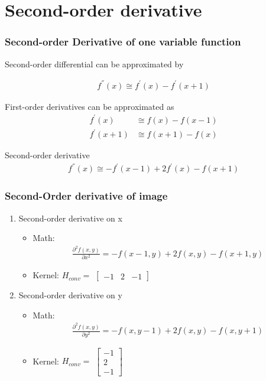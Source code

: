 \documentclass[english,11pt,table,handout]{beamer}
\begin{document}
\section{Second-order derivative}
\frame
{
	\frametitle{Second-order Derivative of one variable function}
	Second-order differential can be approximated by
	
	
	\begin{align} 
		\nonumber
		f^{''}(x) \cong f^{'}(x)  - f^{'}(x+1)
	\end{align}
	
	
	First-order derivatives can be approximated as
	\begin{align}
		\nonumber 
		f^{'}(x) &\cong f(x) - f(x-1) \\
		\nonumber 
		f^{'}(x+1) &\cong f(x+1) - f(x)
	\end{align}
	
	\begin{alertblock}{Second-order derivative}
		\begin{align} 
		\nonumber
		f^{''}(x) \cong -f^{'}(x-1)  + 2f^{'}(x) - f(x+1)
		\end{align}
	\end{alertblock}
	
}
\frame
{
	\frametitle{Second-Order derivative of image}
	
	\begin{enumerate}
		\item Second-order derivative on x
		\begin{itemize}
			\item Math: 
			\begin{align}
				\nonumber
				\frac{\partial^{2} f(x,y)}{\partial x^2} = -f(x-1, y) + 2f(x,y) - f(x+1,y)
			\end{align}
			
			
			\item Kernel:  $H_{conv} = $ $\left[ \begin{array}{rrr} -1 & 2 & -1 \end{array}\right] $
			
		\end{itemize}
		\item Second-order derivative on y
		\begin{itemize}
			\item Math: 
			\begin{align}
			\nonumber
			\frac{\partial^{2} f(x,y)}{\partial y^2} = -f(x, y-1) + 2f(x,y) - f(x,y+1)
			\end{align}
			
			
			\item Kernel:  $H_{conv} = $ $\left[ \begin{array}{r} -1 \\ 2 \\ -1 \end{array}\right]$
			
		\end{itemize}
		
		
	\end{enumerate}
	
}
\end{document}
